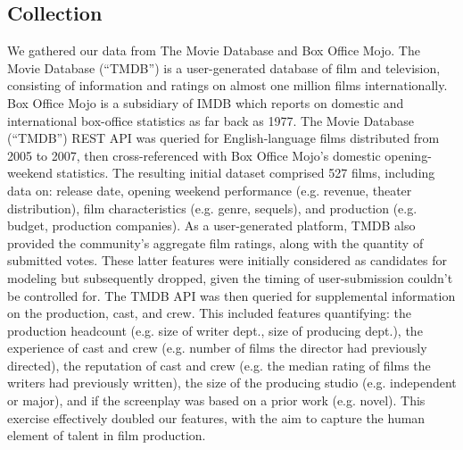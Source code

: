 \documentclass[10pt]{article}
\begin{document}
\subsection{Collection}
We gathered our data from The Movie Database and Box Office Mojo. The Movie Database (“TMDB”) is a user-generated database of film and television, consisting of information and ratings on almost one million films internationally. Box Office Mojo is a subsidiary of IMDB which reports on domestic and international box-office statistics as far back as 1977.
The Movie Database (“TMDB”) REST API was queried for English-language films distributed from 2005 to 2007, then cross-referenced with Box Office Mojo’s domestic opening-weekend statistics. The resulting initial dataset comprised 527 films, including data on: release date, opening weekend performance (e.g. revenue, theater distribution), film characteristics (e.g. genre, sequels), and production (e.g. budget, production companies). As a user-generated platform, TMDB also provided the community’s aggregate film ratings, along with the quantity of submitted votes. These latter features were initially considered as candidates for modeling but subsequently dropped, given the timing of user-submission couldn’t be controlled for. The TMDB API was then queried for supplemental information on the production, cast, and crew. This included features quantifying: the production headcount (e.g. size of writer dept., size of producing dept.), the experience of cast and crew (e.g. number of films the director had previously directed), the reputation of cast and crew (e.g. the median rating of films the writers had previously written), the size of the producing studio (e.g. independent or major), and if the screenplay was based on a prior work (e.g. novel). This exercise effectively doubled our features, with the aim to capture the human element of talent in film production.
\end{document}
